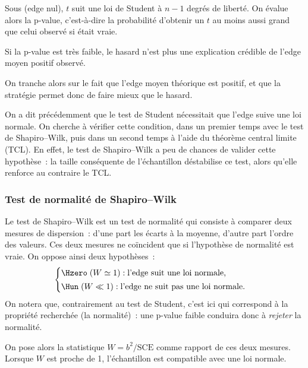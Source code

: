 Sous \Hzero{} (edge nul), \(t\) suit une loi de Student à \(n-1\) degrés
de liberté. On évalue alors la p-value, c'est-à-dire la probabilité
d'obtenir un \(t\) au moins aussi grand que celui observé si \Hzero{}
était vraie.

Si la p-value est très faible, le hasard n'est plus une
explication crédible de l'edge moyen positif observé.

On tranche alors sur le fait que l'edge moyen théorique est positif, et que la
stratégie permet donc de faire mieux que le hasard.


On a dit précédemment que le test de Student nécessitait que l'edge suive
une loi normale. On cherche à vérifier cette condition, dans un premier
temps avec le test de Shapiro--Wilk, puis dans un second temps à l'aide du
théorème central limite (TCL). En effet, le test de Shapiro--Wilk a peu de
chances de valider cette hypothèse~: la taille conséquente de l'échantillon
déstabilise ce test, alors qu'elle renforce au contraire le TCL.

\subsubsection*{Test de normalité de Shapiro--Wilk} %
Le test de Shapiro--Wilk est un test de normalité qui consiste à comparer
deux mesures de dispersion~: d'une part les écarts à la moyenne, d'autre
part l'ordre des valeurs. Ces deux mesures ne coïncident que si
l'hypothèse de normalité est vraie. On oppose ainsi deux hypothèses~:
\[
  \begin{cases}
    \Hzero \;(W \simeq 1) : \text{l'edge suit une loi normale,}\\[2pt]
    \Hun \;(W \ll 1) : \text{l'edge ne suit pas une loi normale.}
  \end{cases}
\]
On notera que, contrairement au test de Student, c'est ici \Hzero{} qui
correspond à la propriété recherchée (la normalité)~: une p-value faible
conduira donc à \emph{rejeter} la normalité.

On pose alors la statistique \(W = b^2 / \mathrm{SCE}\) comme rapport de
ces deux mesures. Lorsque \(W\) est proche de 1, l'échantillon est
compatible avec une loi normale.

